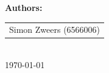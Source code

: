 \begin{titlepage}
    {\Large \textbf{\textcolor{tudelftdarkblue}{Authors:}}}\\[0.5cm]
    \begin{tabular}{c}
        \Large \textcolor{tudelftdarkblue}{Simon Zweers (6566006)} \\
    \end{tabular}\\[2cm]
    
    {\Large \textcolor{tudelftdarkblue}{\today}}
    
    \vfill
    \begin{center}
        
    \end{center}
\end{titlepage}
